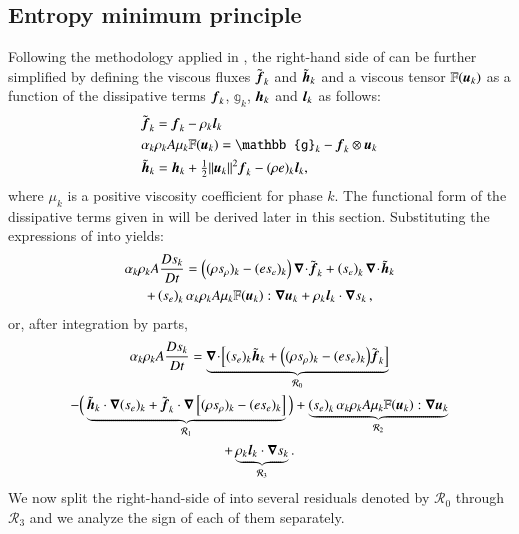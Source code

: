 \documentclass[preprint,10pt]{elsarticle}
\begin{document}
\subsection{Entropy minimum principle}\label{sct:end-min-pr}
%
Following the methodology applied in \cite{jlg, Marco_paper_low_mach}, the right-hand side of 
 can be further simplified by defining the viscous fluxes $\tilde{\boldsymbol f}_k$ and 
$\tilde{\boldsymbol h}_k$ and a viscous tensor $\mathbb{F}(\boldsymbol u_k)$ as a function of the dissipative terms $\boldsymbol f_k$, $\mathbb{g}_k$, $\boldsymbol h_k$ and $\boldsymbol l_k$ as follows:
%
\begin{subequations}\label{eq:def-diss-terms-sect4}
\begin{align}
& \tilde{\mbold f}_k   =   \mbold f_k - \rho_k \mbold  l_k
  \\
&  \alpha_k \rho_k A \mu_k \mathbb{F}(\mbold u_k) =  \mathbb{g}_k -  \mbold f_k \otimes \mbold u_k
  \\
&  \tilde{\mbold h}_k =   \mbold h_k + \tfrac{1}{2}\| \mbold u_k\|^2  \mbold f_k - (\rho e)_k \mbold l_k,
\end{align}
\end{subequations}
%
where $\mu_k$ is a positive viscosity coefficient for phase $k$. The functional form of the dissipative terms given in 
 will be derived later in this section. Substituting the expressions of  
into  yields:
%
\begin{multline}\label{eq:ent-res-7-eqn-diss-terms_rearranged2}
\alpha_k \rho_k A \frac{Ds_k}{Dt} 
=  \left( (\rho s_\rho)_k - (e s_e)_k \right) \boldsymbol\nabla\! \cdot \! \tilde{\boldsymbol f}_k 
+ \left(s_e\right)_k \boldsymbol\nabla\! \cdot \! \tilde{ \boldsymbol h} _k \\
+ \left(s_e\right)_k \alpha_k \rho_k A \mu_k \mathbb{F}(\boldsymbol u_k) : \boldsymbol\nabla \boldsymbol u_k 
+ \rho_k \boldsymbol l _k \cdot \boldsymbol\nabla s_k \,,
\end{multline}
%
or, after integration by parts,
%
\begin{multline}\label{eq:ent-res-7-eqn-diss-terms2}
\alpha_k \rho_k A \frac{Ds_k}{Dt} = 
\underbrace{\boldsymbol\nabla\! \cdot \! \left[ (s_e)_k\tilde{\boldsymbol h}_k +\Big( (\rho s_\rho)_k - (e s_e)_k \Big) \tilde{\boldsymbol f}_k \right]}_{{\mathcal{R}_0}} \\
-\Big(
\underbrace{\tilde{\boldsymbol h}_k \cdot \boldsymbol\nabla (s_e)_k + \tilde{\boldsymbol f}_k \cdot \boldsymbol\nabla \left[  (\rho s_\rho)_k - (e s_e)_k \right]}_{\mathcal{R}_1} 
\Big)
+ \underbrace{ \left(s_e\right)_k \alpha_k \rho_k A \mu_k \mathbb{F}(\boldsymbol u_k) : \boldsymbol\nabla \boldsymbol u_k}_{\mathcal{R}_2} \\
+ \underbrace{\rho_k \boldsymbol l _k \cdot \boldsymbol\nabla s_k}_{\mathcal{R}_3}.
\end{multline}
%
We now split the right-hand-side of  into several residuals denoted by $\mathcal{R}_0$ 
through $\mathcal{R}_3$ and we analyze the sign of each of them separately. 
\end{document}
